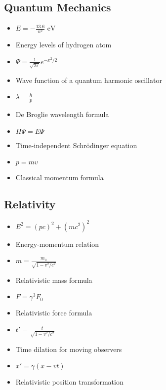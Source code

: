 \documentclass[10pt]{article}
\begin{document}
\begin{multicols*}{3}
        \subsection*{Quantum Mechanics}
\begin{itemize}\footnotesize
        \item $E = - \frac{13.6}{n^2} \text{ eV}$
\item[] Energy levels of hydrogen atom
\item $\Psi = \frac{1}{\sqrt{2\pi}} e^{-x^2/2}$
\item[] Wave function of a quantum harmonic oscillator
\item $\lambda = \frac{h}{p}$
\item[] De Broglie wavelength formula
\item $H\Psi = E\Psi$
\item[] Time-independent Schrödinger equation
\item $p = mv$
\item[] Classical momentum formula
\end{itemize}
        \subsection*{Relativity}
\begin{itemize}\footnotesize
        \item $E^2 = (pc)^2 + (mc^2)^2$
\item[] Energy-momentum relation
\item $m = \frac{m_0}{\sqrt{1 - v^2/c^2}}$
\item[] Relativistic mass formula
\item $F = \gamma^3 F_0$
\item[] Relativistic force formula
\item $t' = \frac{t}{\sqrt{1 - v^2/c^2}}$
\item[] Time dilation for moving observers
\item $x' = \gamma (x - vt)$
\item[] Relativistic position transformation
\end{itemize}
        
    \end{multicols*}
    
\end{document}
